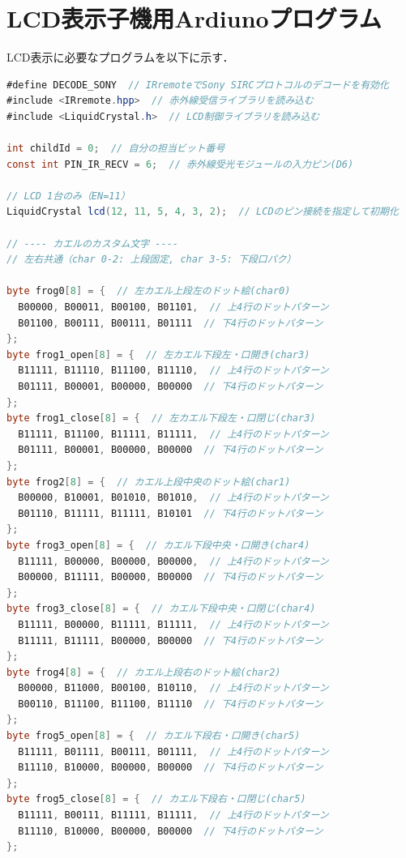 \documentclass[uplatex,dvipdfmx]{jlreq}
\begin{document}
\section{LCD表示子機用Ardiunoプログラム}
\label{sec:lcdmatrix}
LCD表示に必要なプログラムを以下に示す．
\begin{lstlisting}[language=Java]
#define DECODE_SONY  // IRremoteでSony SIRCプロトコルのデコードを有効化
#include <IRremote.hpp>  // 赤外線受信ライブラリを読み込む
#include <LiquidCrystal.h>  // LCD制御ライブラリを読み込む

int childId = 0;  // 自分の担当ビット番号
const int PIN_IR_RECV = 6;  // 赤外線受光モジュールの入力ピン(D6)

// LCD 1台のみ（EN=11）
LiquidCrystal lcd(12, 11, 5, 4, 3, 2);  // LCDのピン接続を指定して初期化

// ---- カエルのカスタム文字 ----
// 左右共通（char 0-2: 上段固定, char 3-5: 下段口パク）

byte frog0[8] = {  // 左カエル上段左のドット絵(char0)
  B00000, B00011, B00100, B01101,  // 上4行のドットパターン
  B01100, B00111, B00111, B01111  // 下4行のドットパターン
};
byte frog1_open[8] = {  // 左カエル下段左・口開き(char3)
  B11111, B11110, B11100, B11110,  // 上4行のドットパターン
  B01111, B00001, B00000, B00000  // 下4行のドットパターン
};
byte frog1_close[8] = {  // 左カエル下段左・口閉じ(char3)
  B11111, B11100, B11111, B11111,  // 上4行のドットパターン
  B01111, B00001, B00000, B00000  // 下4行のドットパターン
};
byte frog2[8] = {  // カエル上段中央のドット絵(char1)
  B00000, B10001, B01010, B01010,  // 上4行のドットパターン
  B01110, B11111, B11111, B10101  // 下4行のドットパターン
};
byte frog3_open[8] = {  // カエル下段中央・口開き(char4)
  B11111, B00000, B00000, B00000,  // 上4行のドットパターン
  B00000, B11111, B00000, B00000  // 下4行のドットパターン
};
byte frog3_close[8] = {  // カエル下段中央・口閉じ(char4)
  B11111, B00000, B11111, B11111,  // 上4行のドットパターン
  B11111, B11111, B00000, B00000  // 下4行のドットパターン
};
byte frog4[8] = {  // カエル上段右のドット絵(char2)
  B00000, B11000, B00100, B10110,  // 上4行のドットパターン
  B00110, B11100, B11100, B11110  // 下4行のドットパターン
};
byte frog5_open[8] = {  // カエル下段右・口開き(char5)
  B11111, B01111, B00111, B01111,  // 上4行のドットパターン
  B11110, B10000, B00000, B00000  // 下4行のドットパターン
};
byte frog5_close[8] = {  // カエル下段右・口閉じ(char5)
  B11111, B00111, B11111, B11111,  // 上4行のドットパターン
  B11110, B10000, B00000, B00000  // 下4行のドットパターン
};



\end{lstlisting}
\end{document}
